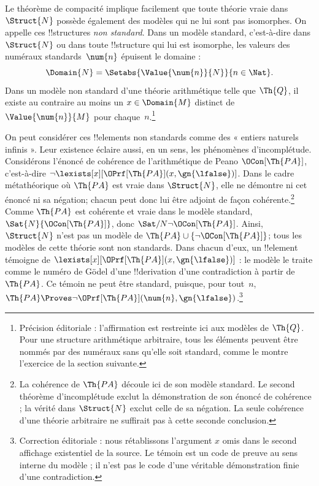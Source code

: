 \documentclass[../../../include/open-logic-section]{subfiles}
\begin{document}
Le théorème de compacité implique facilement que toute théorie
vraie dans~$\Struct{N}$ possède également des modèles qui ne
lui sont pas isomorphes. On appelle ces !!{structure}s
\emph{non standard}. Dans un modèle standard, c'est-à-dire
dans $\Struct{N}$ ou dans toute !!{structure} qui lui est
isomorphe, les valeurs des numéraux standards~$\num{n}$
épuisent le domaine :
\[
  \Domain{N}=\Setabs{\Value{\num{n}}{N}}{n\in\Nat}.
\]
Dans un modèle non standard d'une théorie arithmétique telle
que $\Th{Q}$, il existe au contraire au moins un
$x\in\Domain{M}$ distinct de
$\Value{\num{n}}{M}$ pour chaque~$n$.\footnote{Précision éditoriale : l'affirmation est restreinte ici aux modèles de $\Th{Q}$. Pour une structure arithmétique arbitraire, tous les éléments peuvent être nommés par des numéraux sans qu'elle soit standard, comme le montre l'exercice de la section suivante.}

On peut considérer ces !!{element}s non standards comme des
« entiers naturels infinis ». Leur existence éclaire aussi,
en un sens, les phénomènes d'incomplétude. Considérons
l'énoncé de cohérence de l'arithmétique de Peano
$\OCon[\Th{PA}]$, c'est-à-dire
$\lnot\lexists[x][\OPrf[\Th{PA}](x,\gn{\lfalse})]$.
Dans le cadre métathéorique où $\Th{PA}$ est vraie dans $\Struct{N}$, elle ne démontre ni cet énoncé ni sa
négation; chacun peut donc lui être adjoint de façon
cohérente.\footnote{La cohérence de $\Th{PA}$ découle ici de son modèle standard. Le second théorème d'incomplétude exclut la démonstration de son énoncé de cohérence ; la vérité dans $\Struct{N}$ exclut celle de sa négation. La seule cohérence d'une théorie arbitraire ne suffirait pas à cette seconde conclusion.} Comme $\Th{PA}$ est cohérente et vraie dans le
modèle standard, $\Sat{N}{\OCon[\Th{PA}]}$, donc
$\Sat/{N}{\lnot\OCon[\Th{PA}]}$. Ainsi, $\Struct{N}$
n'est pas un modèle de
$\Th{PA}\cup\{\lnot\OCon[\Th{PA}]\}$; tous les modèles
de cette théorie sont non standards. Dans chacun d'eux,
un !!{element} témoigne de
$\lexists[x][\OPrf[\Th{PA}](x,\gn{\lfalse})]$ :
le modèle le traite comme le numéro de Gödel d'une
!!{derivation} d'une contradiction à partir de~$\Th{PA}$.
Ce témoin ne peut être standard, puisque, pour tout~$n$,
$\Th{PA}\Proves
\lnot\OPrf[\Th{PA}](\num{n},\gn{\lfalse})$.\footnote{Correction éditoriale : nous rétablissons l'argument $x$ omis dans le second affichage existentiel de la source. Le témoin est un code de preuve au sens interne du modèle ; il n'est pas le code d'une véritable démonstration finie d'une contradiction.}
\end{document}

